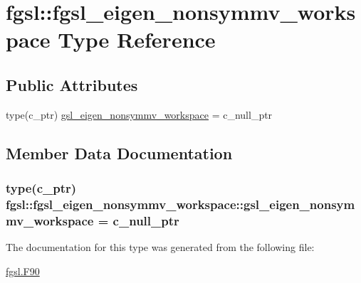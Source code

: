 \hypertarget{structfgsl_1_1fgsl__eigen__nonsymmv__workspace}{\section{fgsl\-:\-:fgsl\-\_\-eigen\-\_\-nonsymmv\-\_\-workspace Type Reference}
\label{structfgsl_1_1fgsl__eigen__nonsymmv__workspace}
}
\subsection*{Public Attributes}
\begin{DoxyCompactItemize}
\item 
type(c\-\_\-ptr) \hyperlink{structfgsl_1_1fgsl__eigen__nonsymmv__workspace_a3ec6c0a7879746daf301e68adf02a03d}{gsl\-\_\-eigen\-\_\-nonsymmv\-\_\-workspace} = c\-\_\-null\-\_\-ptr
\end{DoxyCompactItemize}


\subsection{Member Data Documentation}
\hypertarget{structfgsl_1_1fgsl__eigen__nonsymmv__workspace_a3ec6c0a7879746daf301e68adf02a03d}{
\subsubsection[{gsl\-\_\-eigen\-\_\-nonsymmv\-\_\-workspace}]{\setlength{\rightskip}{0pt plus 5cm}type(c\-\_\-ptr) fgsl\-::fgsl\-\_\-eigen\-\_\-nonsymmv\-\_\-workspace\-::gsl\-\_\-eigen\-\_\-nonsymmv\-\_\-workspace = c\-\_\-null\-\_\-ptr}}\label{structfgsl_1_1fgsl__eigen__nonsymmv__workspace_a3ec6c0a7879746daf301e68adf02a03d}


The documentation for this type was generated from the following file\-:\begin{DoxyCompactItemize}
\item 
\hyperlink{fgsl_8F90}{fgsl.\-F90}\end{DoxyCompactItemize}
